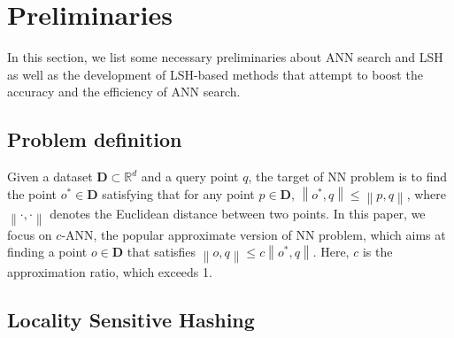 \documentclass[twocolumn]{svjour3}          %
\begin{document}
\section{Preliminaries}\label{sec:pre}
In this section, we list some necessary preliminaries about ANN search and LSH as well as the development of LSH-based methods that attempt to boost the accuracy and the efficiency of ANN search.



\subsection{Problem definition}\label{subsec:ann}
Given a dataset $\textbf{D} \subset \mathbb{R}^{d}$ and a query point $q$, the target of NN problem is to find the point $o^{\ast} \in \textbf{D}$ satisfying that for any point $p \in \textbf{D}$, $\left\|{o^{\ast},q}\right\| \leq \left\|{p,q}\right\|$, where $\left\|{\cdot,\cdot}\right\|$ denotes the Euclidean distance between two points. In this paper, we focus on $c$-ANN, the popular approximate version of NN problem, which aims at finding a point $o \in \textbf{D}$ that satisfies $\left\| {o,q} \right\| \le c\left\| {o^{*},q} \right\|$. Here, $c$ is the approximation ratio, which exceeds 1.

\subsection{Locality Sensitive Hashing}\label{sec:lsh}
\end{document}
